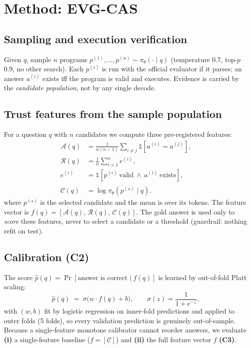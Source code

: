 \documentclass[conference]{IEEEtran}
\newcommand{\ourmethod}{EVG-CAS}
\newcommand{\p}{\hat p}
\begin{document}
\section{Method: \ourmethod{}}\label{sec:method}

\subsection{Sampling and execution verification}
Given $q$, sample $n$ programs $p^{(1)},\dots,p^{(n)}\sim\pi_{\theta}(\cdot\mid q)$
(temperature 0.7, top-$p$ 0.9, no other search). Each $p^{(i)}$ is run with the official
evaluator if it parses; an answer $a^{(i)}$ exists iff the program is valid and executes.
Evidence is carried by the \emph{candidate population}, not by any single decode.

\subsection{Trust features from the sample population}
For a question $q$ with $n$ candidates we compute three pre-registered features:
\begin{align}
  \mathcal{A}(q) &= \frac{1}{n(n-1)}\sum_{i\neq j}
    \mathbb{1}[a^{(i)} = a^{(j)}],\\
  \mathcal{R}(q) &= \frac{1}{n}\sum_{i=1}^{n} e^{(i)},\\
  e^{(i)} &= \mathbb{1}[p^{(i)}\ \text{valid}\ \wedge\ a^{(i)}\ \text{exists}],\\
  \mathcal{C}(q) &= \overline{\log\pi_{\theta}(p^{(\star)}\mid q)}.
\end{align}
where $p^{(\star)}$ is the selected candidate and the mean is over its tokens.
The feature vector is $f(q)=[\mathcal{A}(q),\,\mathcal{R}(q),\,\mathcal{C}(q)]$. The gold
answer is used only to \emph{score} these features, never to select a candidate or a
threshold (guardrail: nothing refit on test).

\subsection{Calibration (C2)}
The score $\p(q) = \Pr[\text{answer is correct} \mid f(q)]$ is learned by out-of-fold
Platt scaling:
\begin{equation}
  \p(q) \;=\; \sigma\!\big(w\cdot f(q) + b\big), \qquad
  \sigma(z) = \frac{1}{1+e^{-z}} ,
\end{equation}
with $(w,b)$ fit by logistic regression on inner-fold predictions and applied to outer folds
(5 folds), so every validation prediction is genuinely out-of-sample. Because a single-feature
monotone calibrator cannot reorder answers, we evaluate \textbf{(i)} a single-feature baseline
($f=[\mathcal{C}]$) and \textbf{(ii)} the full feature vector $f$ \textbf{(C3)}.
\end{document}
